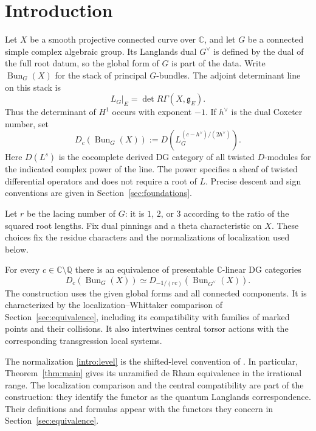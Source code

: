 \section{Introduction}\label{sec:introduction}

Let $X$ be a smooth projective connected curve over $\mathbb C$, and let $G$
be a connected simple complex algebraic group. Its Langlands dual
$G^\vee$ is defined by the dual of the full root datum, so the global form
of $G$ is part of the data. Write $\operatorname{Bun}_G(X)$ for the stack
of principal $G$-bundles. The adjoint determinant line on this stack is
\[
  L_G|_E=\det R\Gamma(X,\mathfrak g_E).
\]
Thus the determinant of $H^1$ occurs with exponent $-1$. If $h^\vee$ is
the dual Coxeter number, set
\begin{equation}\label{intro:level}
  D_c(\operatorname{Bun}_G(X))
  :=D\!\left(L_G^{(c-h^\vee)/(2h^\vee)}\right).
\end{equation}
Here $D(L^s)$ is the cocomplete derived DG category of all twisted
$D$-modules for the indicated complex power of the line. The power specifies
a sheaf of twisted differential operators and does not require a root of
$L$. Precise descent and sign conventions are given in
Section~\ref{sec:foundations}.

Let $r$ be the lacing number of $G$: it is $1$, $2$, or $3$ according to
the ratio of the squared root lengths. Fix dual pinnings and a theta
characteristic on $X$. These choices fix the residue characters and the
normalizations of localization used below.

\begin{theorem}\label{thm:main}
For every $c\in\mathbb C\setminus\mathbb Q$ there is an equivalence of
presentable $\mathbb C$-linear DG categories
\begin{equation}\label{intro:equivalence}
  D_c(\operatorname{Bun}_G(X))
    \simeq
  D_{-1/(rc)}(\operatorname{Bun}_{G^\vee}(X)).
\end{equation}
The construction uses the given global forms and all connected components.
It is characterized by the localization--Whittaker comparison of
Section~\ref{sec:equivalence}, including its compatibility with families of
marked points and their collisions. It also intertwines central torsor actions
with the corresponding transgression local systems.
\end{theorem}

The normalization \eqref{intro:level} is the shifted-level convention of
\cite[Section~1.1.5, Conjecture~1]{BogdanovaBetti}. In particular,
Theorem~\ref{thm:main} gives its unramified de Rham equivalence in the
irrational range. The localization comparison and the central compatibility
are part of the construction: they identify the functor as the quantum
Langlands correspondence. Their definitions and formulas appear with the
functors they concern in Section~\ref{sec:equivalence}.

